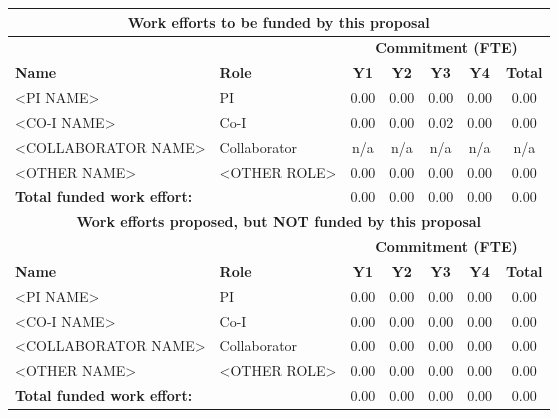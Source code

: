 \begin{table}[htbp]
\begin{center}
\begin{tabular}{|l|l|c|c|c|c|c|}
\hline

\multicolumn{7}{|c|}{\textbf{Work efforts to be funded by this proposal}} \\
\hline
\multicolumn{1}{|l|}{}&\multicolumn{1}{|l|}{} & \multicolumn{5}{|c|}{\textbf{Commitment (FTE)}} \\
\cline{3-7}
\bf{Name} & \bf{Role} & \bf{Y1} & \bf{Y2} & \bf{Y3} & \bf{Y4} & \bf{Total} \\
\hline
<PI NAME> & PI & 0.00 & 0.00 & 0.00 & 0.00 & 0.00 \\
<CO-I NAME> & Co-I &  0.00 & 0.00 & 0.02 & 0.00 & 0.00 \\
<COLLABORATOR NAME> & Collaborator & n/a & n/a & n/a & n/a & n/a\\
<OTHER NAME> & <OTHER ROLE> &  0.00 & 0.00 & 0.00 & 0.00 & 0.00 \\
\hline
\multicolumn{2}{|l|}{\textbf{Total funded work effort:}} & 0.00 & 0.00 & 0.00 & 0.00 & 0.00\\
\hline

\multicolumn{7}{|c|}{\textbf{Work efforts proposed, but NOT funded by this proposal}} \\
\hline
\multicolumn{1}{|l|}{}&\multicolumn{1}{|l|}{} & \multicolumn{5}{|c|}{\textbf{Commitment (FTE)}} \\
\cline{3-7}
\bf{Name} & \bf{Role} & \bf{Y1} & \bf{Y2} & \bf{Y3} & \bf{Y4} & \bf{Total} \\
\hline
<PI NAME> & PI & 0.00 & 0.00 & 0.00 & 0.00 & 0.00 \\
<CO-I NAME> & Co-I &  0.00 & 0.00 & 0.00 & 0.00 & 0.00 \\
<COLLABORATOR NAME> & Collaborator & 0.00 & 0.00 & 0.00 & 0.00 & 0.00 \\
<OTHER NAME> & <OTHER ROLE> &  0.00 & 0.00 & 0.00 & 0.00 & 0.00 \\
\hline
\multicolumn{2}{|l|}{\textbf{Total funded work effort:}} & 0.00 & 0.00 & 0.00 & 0.00 & 0.00\\
\hline


\end{tabular}
\end{center}
\end{table}
